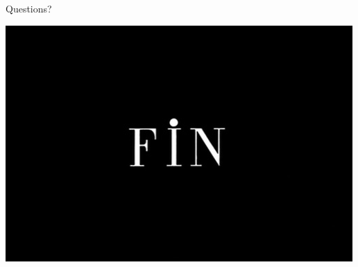 \documentclass{beamer}
\begin{document}
\begin{frame}{Questions?}
	\begin{center}
		\includegraphics[width=.7\textwidth]{images/fin.png}
	\end{center}
\end{frame}
\end{document}
